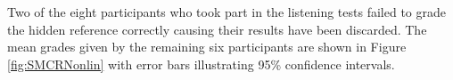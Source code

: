 		Two of the eight participants who took part in the listening tests failed to grade the hidden reference
		correctly causing their results have been discarded. The mean grades given by the remaining six participants
		are shown in Figure \ref{fig:SMCRNonlin} with error bars illustrating 95\% confidence intervals. 


		\begin{figure}[h!]
			\centering
			\quad


\end{figure}
